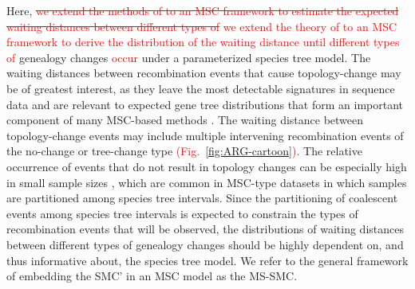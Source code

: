 \documentclass[11pt]{article}
\begin{document}
Here, 
\textcolor{red}{
\sout{we extend the methods of \mbox{\citet{deng_distribution_2021}} to an MSC framework 
to estimate the expected waiting distances between different types of}
we extend the theory of \citet{deng_distribution_2021} to an MSC framework
to derive the distribution of the waiting distance until different types of
} 
genealogy changes 
\textcolor{red}{occur} 
under a parameterized species tree model.
The waiting distances between recombination events that cause topology-change 
may be of greatest interest, as they leave the most detectable signatures 
in sequence data and are relevant to expected gene tree distributions that form
an important component of many MSC-based methods \citep{
degnan2009gene, baum_concordance_2007, knowles_estimating_2011}.
The waiting distance between topology-change events may include multiple
intervening recombination events of the no-change or tree-change type
\textcolor{red}{(Fig.~\ref{fig:ARG-cartoon}).}
The relative occurrence of events that do not result in topology 
changes can be especially high in small sample sizes \citep{wilton2015smc}, 
which are common in MSC-type datasets in which samples are partitioned 
among species tree intervals. 
Since the partitioning of 
coalescent events among species tree intervals is expected to constrain 
the types of recombination events that will be observed, the
distributions of waiting distances between different types of 
genealogy changes should be highly dependent on, and thus informative about, 
the species tree model. We refer to the general framework of embedding the 
SMC' in an MSC model as the MS-SMC.


\end{document}
